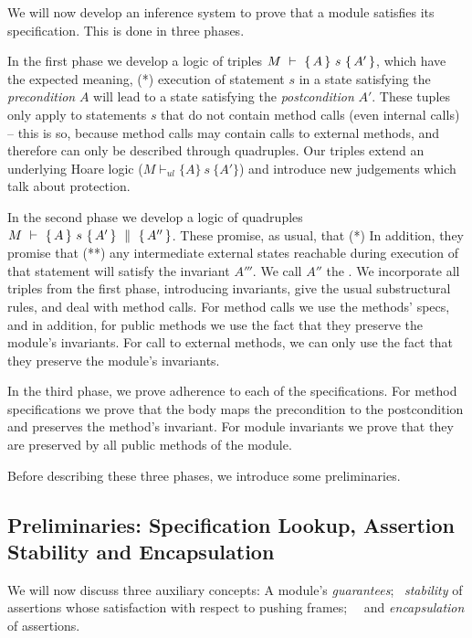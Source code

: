 We will now develop an inference system to prove that a module %
satisfies its specification. This is done in three phases.

In the first phase we develop a logic of triples ${M\ \vdash\ \{\,A\, \} \ s\  \{\,A'\, \} }$, which have the expected meaning, \ie 
(*) execution of statement $s$ in a state satisfying {the \emph{precondition}}  $A$ will lead to a state satisfying  {the \emph{postcondition}}  $A'$.
These tuples only apply to statements $s$ that  do not contain method calls  (even internal calls) -- this is so, because method calls may contain calls to external methods, and therefore can only be described through quadruples.
Our triples extend an underlying Hoare logic  (${M \vdash_{ul}  \{A\} {\ s\ } \{A'\} }$) and  introduce new judgements  which talk about protection.

In the second phase we develop a logic of quadruples ${M\ \vdash\ \{\,A\, \} \ s\  \{\,A'\, \}\, \,\parallel\,\, \{\, A'' \, \}}$. These promise, as usual, that (*) 
In addition, they promise that (**) any intermediate external states reachable during execution of that statement will satisfy the invariant  $A'''$.  
{We call $A''$ the \midcond.}
 We incorporate all triples from the first phase,       
introducing invariants, give the usual substructural rules, and deal with method calls. 
For method calls we use the methods' specs, and in addition, for public methods we use the fact that they preserve the module's invariants. 
For call to external  methods, we can only use the fact that they preserve the module's invariants. 
 
In the third phase, we prove adherence to each of the specifications. 
For method specifications we prove that the body maps the precondition to the postcondition and preserves the method's invariant. 
For module invariants we prove that they  are preserved by all public methods of the module.

\vspace{.1cm}
Before describing these three phases, we introduce some preliminaries.


\subsection{Preliminaries: Specification Lookup, Assertion Stability  and  Encapsulation}

We will now discuss  three auxiliary concepts: A module's \emph{guarantees}; \   \emph{stability} of assertions whose satisfaction   with respect to pushing frames; \ \ and \emph{encapsulation}  of assertions. 


